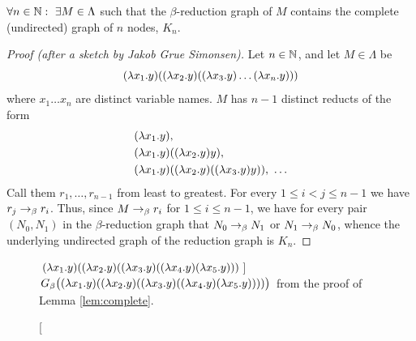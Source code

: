 \begin{lemma}\label{lem:complete}
	$\forall n\in\mathbb{N}:\ \exists M\in\Lambda$ such that the $\beta$-reduction graph of $M$
	contains the complete (undirected) graph of $n$ nodes, $K_n$.
\end{lemma}
\begin{proof}[Proof (after a sketch by Jakob Grue Simonsen)]
	Let $n\in\mathbb{N}$, and let $M\in\Lambda$ be
	\begin{equation*}
		(\lambda x_1.y) ((\lambda x_2.y) ((\lambda x_3.y)\hdots(\lambda x_{n}.y)))
	\end{equation*}
	where $x_1\hdots x_n$ are distinct variable names. $M$ has $n-1$ distinct reducts of the form
	\begin{align*}
		&(\lambda x_1.y), \\
		&(\lambda x_1.y)((\lambda x_2.y) y), \\
		&(\lambda x_1.y)((\lambda x_2.y) ((\lambda x_3.y) y)),\ \hdots
	\end{align*}
	Call them $r_1,\hdots,r_{n-1}$ from least to greatest. For every
	$1\leq i < j \leq n-1$ we have $r_j\rightarrow_\beta r_i$. Thus, since $M\rightarrow_\beta r_i$ 
	for $1\leq i \leq n-1$, we have for every pair $(N_0,N_1)$ in the $\beta$-reduction 
	graph that $N_0\rightarrow_\beta N_1$ or $N_1\rightarrow_\beta N_0$, whence the underlying 
	undirected graph of the reduction graph is $K_n$.
\end{proof}

\begin{figure}[htpb]
	\centering
	\caption
	[$(\lambda x_1.y) ((\lambda x_2.y) ((\lambda x_3.y) ((\lambda x_4.y) (\lambda x_5.y)))$]
	{$G_\beta\big((\lambda x_1.y) ((\lambda x_2.y) ((\lambda x_3.y) ((\lambda x_4.y) (\lambda x_5.y))))\big)$
	from the proof of Lemma \ref{lem:complete}.}
	\label{fig:images_lambda_k5}
\end{figure}

